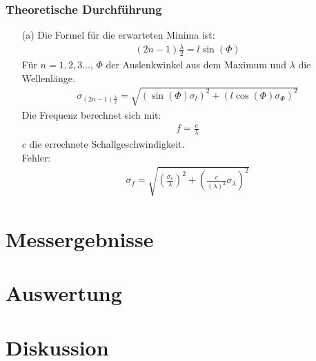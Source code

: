 \documentclass[12pt]{scrartcl}
\begin{document}
\subsubsection{Theoretische Durchführung}
\begin{enumerate}
\item[(a)]
Die Formel für die erwarteten Minima ist:
\begin{align}
(2n-1)\frac{\lambda}{2} = l \sin(\Phi)
\end{align}
Für $n = 1,2,3...$, $\Phi$ der Auslenkwinkel aus dem Maximum und $\lambda$ die Wellenlänge.\\
\begin{align}
\sigma_{(2n-1)\frac{\lambda}{2}} = \sqrt{
\left(\sin(\Phi)\sigma_l\right)^2+
\left(l \cos(\Phi)\sigma_{\Phi}\right)^2}
\end{align}
Die Frequenz berechnet sich mit:
\begin{align}
f = \frac{c}{\lambda} 
\end{align}
$c$ die errechnete Schallgeschwindigkeit.\\
Fehler:
\begin{align}
\sigma_f = \sqrt{
\left(\frac{\sigma_{c}}{\lambda}\right)^2+
\left(\frac{c}{(\lambda)^2}\sigma_{\lambda}\right)^2}
\end{align}
\end{enumerate}




\section{Messergebnisse}



\section{Auswertung}


\section{Diskussion}


\end{document}
